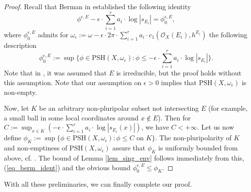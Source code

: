 \documentclass[12pt]{article}
\numberwithin{equation}{section}
\theoremstyle{theorem}
\theoremstyle{definition}
\theoremstyle{remark}
\begin{document}
	\begin{proof}
		Recall that Berman in \cite[Lemma 4.1]{BermanEnvProj} established the following identity
		\begin{equation}\label{eq_berm_ident}
			\phi^{\epsilon, E} - \epsilon \cdot \sum_{i = 1}^{r} a_i \cdot \log |s_{E_i}|
			=
			\phi^{\epsilon, E}_{0}, 
		\end{equation}
		where $\phi^{\epsilon, E}_{0}$ admits for $\omega_{\epsilon} := \omega - \epsilon \cdot 2 \pi \cdot \sum_{i = 1}^{r} a_i \cdot c_1(\mathscr{O}_X(E_i), h^{E_i})$ the following description
		\begin{equation}
			\phi^{\epsilon, E}_{0} := \sup \Big\{ \phi \in {\textrm{PSH}}(X, \omega_{\epsilon}) : \phi \leq - \epsilon \cdot \sum_{i = 1}^{r} a_i \cdot \log |s_{E_i}| \Big\}.
		\end{equation}
		Note that in \cite[Lemma 4.1]{BermanEnvProj}, it was assumed that $E$ is irreducible, but the proof holds without this assumption. 
		Note that our assumption on $\epsilon > 0$ implies that ${\textrm{PSH}}(X, \omega_{\epsilon})$ is non-empty.
		\par 
		Now, let $K$ be an arbitrary non-pluripolar subset not intersecting $E$ (for example, a small ball in some local coordinates around $x \notin E$).
		Then for $C := \sup_{x \in K} ( - \epsilon \cdot \sum_{i = 1}^{r} a_i \cdot \log |s_{E_i}(x)| )$, we have $C < +\infty$. 
		Let us now define $\phi_K := \sup \{ \phi \in {\textrm{PSH}}(X, \omega_{\epsilon}) : \phi \leq C \text{ on } K \}$.
		The non-pluripolarity of $K$ and non-emptiness of ${\textrm{PSH}}(X, \omega_{\epsilon})$ assure that $\phi_K$ is uniformly bounded from above, cf. \cite[Theorem 9.17]{GuedZeriGeomAnal}.
		The bound of Lemma \ref{lem_sing_env} follows immediately from this, (\ref{eq_berm_ident}) and the obvious bound $\phi^{\epsilon, E}_{0} \leq \phi_K$.
	\end{proof}
	With all these preliminaries, we can finally complete our proof.
\end{document}
